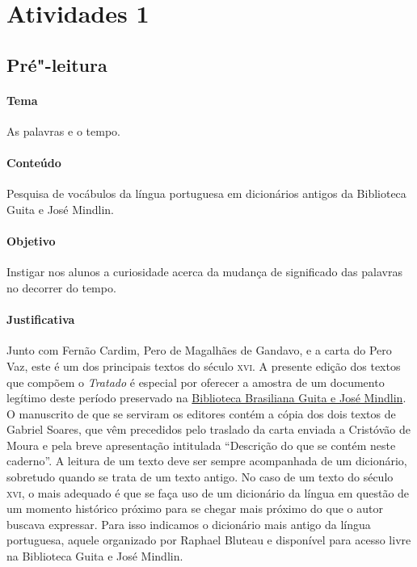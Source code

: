 \documentclass[12pt]{extarticle}
\begin{document}
\tableofcontents

\section{Atividades 1}


\subsection{Pré"-leitura}


\paragraph{Tema} As palavras e o tempo. 

\paragraph{Conteúdo} Pesquisa de vocábulos da língua portuguesa em 
dicionários antigos da Biblioteca Guita e José Mindlin. 

\paragraph{Objetivo} Instigar nos alunos a curiosidade acerca da mudança
de significado das palavras no decorrer do tempo. 

\paragraph{Justificativa} Junto com Fernão Cardim, Pero de Magalhães de 
Gandavo, e a carta do Pero Vaz, este é um dos principais textos do século 
\textsc{xvi}. A presente edição dos textos que compõem o \emph{Tratado} 
é especial por oferecer a amostra de um documento legítimo deste período
preservado na \href{https://digital.bbm.usp.br/view/?45000009023#page/1/mode/2up}{Biblioteca Brasiliana Guita e José Mindlin}. O manuscrito 
de que se serviram os editores contém a cópia dos dois textos de Gabriel 
Soares, que vêm precedidos pelo traslado da carta enviada a Cristóvão de 
Moura e pela breve apresentação intitulada ``Descrição do que se contém 
neste caderno''. 
A leitura de um texto deve ser sempre acompanhada de um dicionário,
sobretudo quando se trata de um texto antigo. No caso de um texto do 
século \textsc{xvi}, o mais adequado é que se faça uso de um dicionário 
da língua em questão de um momento histórico próximo para se chegar mais 
próximo do que o autor buscava expressar. Para isso indicamos o dicionário 
mais antigo da língua portuguesa, aquele organizado por Raphael Bluteau e 
disponível para acesso livre na Biblioteca Guita e José Mindlin.
\end{document}
